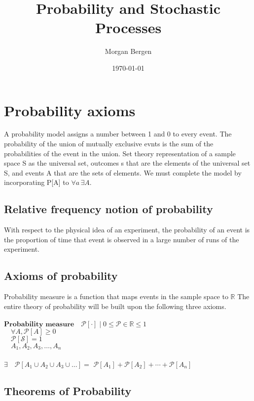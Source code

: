 \documentclass[10pt]{article}
\title{Probability and Stochastic Processes}
\author{Morgan Bergen}
\date{\today}
\begin{document}
\maketitle

\section[1]{Probability axioms}

A probability model assigns a number between 1 and 0 to every event.
The probability of the union of mutually exclusive evnts is the sum of the probabilities of the event in the union.
Set theory representation of a sample space S as the universal set, outcomes s that are the elements of the universal set S, and events A that are the sets of elements.  We must complete the model by incorporating P[A] to $\forall a\, \exists A$.

\subsection{Relative frequency notion of probability}
With respect to the physical idea of an experiment, the probability of an event is the proportion of time that event is observed in a large number of runs of the experiment.

\subsection{Axioms of probability}
Probability measure is a function that maps events in the sample space to $\mathbb{R}$   The entire theory of probability will be built upon the following three axioms. \\\\
$\textbf{Probability measure} \quad \mathcal{P}[\cdot] \mid 0\leq \mathcal{P} \in \mathbb{R} \leq 1$ \\

$\quad \forall{A}, \mathcal{P}[A] \geq {0}$ \\

$\quad \mathcal{P}[\mathcal{S}]=1$ \\

$\quad A_{1}, A_{2}, A_{3},\ldots,A_{n}$  \\\\ 
$\exists \quad \mathcal{P}[A_{1} \cup A_{2} \cup A_3 \cup \ldots] =$ 
$\mathcal{P}[A_{1}] + \mathcal{P}[A_{2}] + \cdots + \mathcal{P}[A_{n}] $ \\

\subsection{Theorems of Probability}
\end{document}
